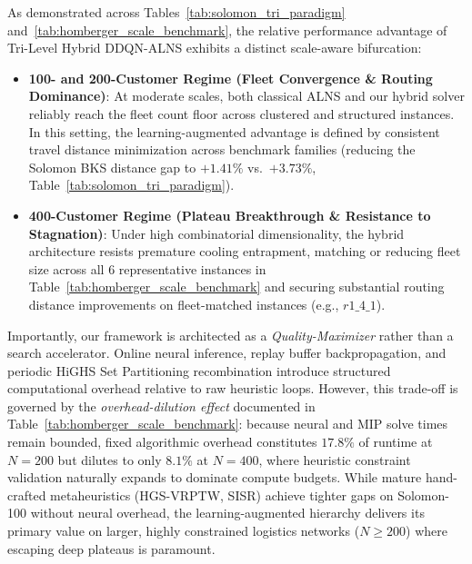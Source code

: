 \documentclass{ieeeaccess}
\begin{document}
As demonstrated across Tables~\ref{tab:solomon_tri_paradigm} and~\ref{tab:homberger_scale_benchmark}, the relative performance advantage of Tri-Level Hybrid DDQN-ALNS exhibits a distinct scale-aware bifurcation:
\begin{itemize}
    \item \textbf{100- and 200-Customer Regime (Fleet Convergence \& Routing Dominance)}: At moderate scales, both classical ALNS and our hybrid solver reliably reach the fleet count floor across clustered and structured instances. In this setting, the learning-augmented advantage is defined by consistent travel distance minimization across benchmark families (reducing the Solomon BKS distance gap to $+1.41\%$ vs.\ $+3.73\%$, Table~\ref{tab:solomon_tri_paradigm}).
    \item \textbf{400-Customer Regime (Plateau Breakthrough \& Resistance to Stagnation)}: Under high combinatorial dimensionality, the hybrid architecture resists premature cooling entrapment, matching or reducing fleet size across all 6 representative instances in Table~\ref{tab:homberger_scale_benchmark} and securing substantial routing distance improvements on fleet-matched instances (e.g., $r1\_4\_1$).
\end{itemize}

Importantly, our framework is architected as a \emph{Quality-Maximizer} rather than a search accelerator. Online neural inference, replay buffer backpropagation, and periodic HiGHS Set Partitioning recombination introduce structured computational overhead relative to raw heuristic loops. However, this trade-off is governed by the \textit{overhead-dilution effect} documented in Table~\ref{tab:homberger_scale_benchmark}: because neural and MIP solve times remain bounded, fixed algorithmic overhead constitutes $17.8\%$ of runtime at $N=200$ but dilutes to only $8.1\%$ at $N=400$, where heuristic constraint validation naturally expands to dominate compute budgets. While mature hand-crafted metaheuristics (HGS-VRPTW, SISR) achieve tighter gaps on Solomon-100 without neural overhead, the learning-augmented hierarchy delivers its primary value on larger, highly constrained logistics networks ($N \ge 200$) where escaping deep plateaus is paramount.
\end{document}

